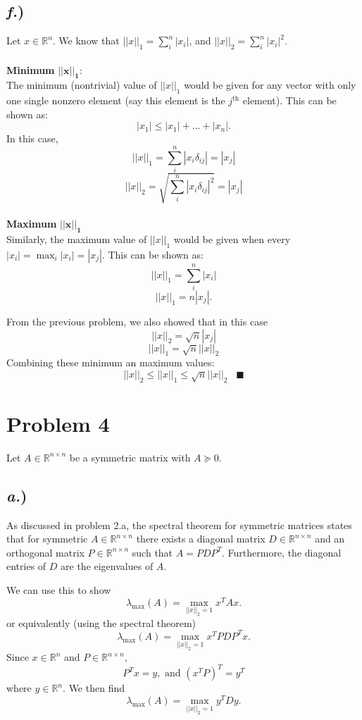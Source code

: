 \documentclass{report}
\begin{document}
\subsection*{\textit{f.})}

Let $x \in \mathbb{R}^n$. We know that $||x||_1 = \sum_i^n{|x_i|}$, and $||x||_2 = \sum_i^n{|x_i|^2}$. \\
\-\\
\textbf{Minimum }$\bm{||x||_1}:$\\
The minimum (nontrivial) value of $||x||_1$ would be given for any vector with only one single nonzero element (say this element is the $j^{\text{th}}$ element). This can be shown as:
$$ |x_1| \leq |x_1| + ... + |x_n|.$$
In this case, 
$$ ||x||_1 = \sum_i^n{|x_i \delta_{ij}|} = |x_j| $$
$$ ||x||_2 = \sqrt{\sum_i^n{|x_i \delta_{ij}|^2}} = |x_j| $$
\-\\
\textbf{Maximum }$\bm{||x||_1}$ \\
Similarly, the maximum value of $||x||_1$ would be given when every $|x_i| = \max_i{|x_i|} = |x_j|$. This can be shown as:
$$ ||x||_1 = \sum_i^n{|x_i|} $$
$$ ||x||_1 =  n|x_j|. $$ 

From the previous problem, we also showed that in this case
 $$ ||x||_2 = \sqrt{n}|x_j| $$
 $$ ||x||_1 = \sqrt{n}||x||_2 $$
Combining these minimum an maximum values:
$$ ||x||_2 \leq ||x||_1 \leq \sqrt{n}||x||_2 \;\;\; \blacksquare$$

  
  
\newpage
\section*{Problem 4}

Let $A \in \mathbb{R}^{n \times n}$ be a symmetric matrix with $A \succeq 0$. 

\subsection*{\textit{a.})}

As discussed in problem 2.a, the spectral theorem for symmetric matrices states that for symmetric $A \in \mathbb{R}^{n \times n}$ there exists a diagonal matrix $D \in \mathbb{R}^{n \times n}$ and an orthogonal matrix $P \in \mathbb{R}^{n \times n}$ such that $A = PDP^T$. Furthermore, the diagonal entries of $D$ are the eigenvalues of $A$.

We can use this to show 
$$\lambda_{\text{max}}(A) = \max_{||x||_2=1}{x^TAx}.$$
or equivalently (using the spectral theorem)
$$\lambda_{\text{max}}(A) = \max_{||x||_2=1}{x^TPDP^Tx}.$$
Since $x \in \mathbb{R}^n$ and $P \in \mathbb{R}^{n \times n}$,
$$ P^Tx = y, \text{ and } (x^TP)^T = y^T $$
where $y \in \mathbb{R}^n$. We then find
$$\lambda_{\text{max}}(A) = \max_{||x||_2=1}{y^TDy}.$$
\end{document}
